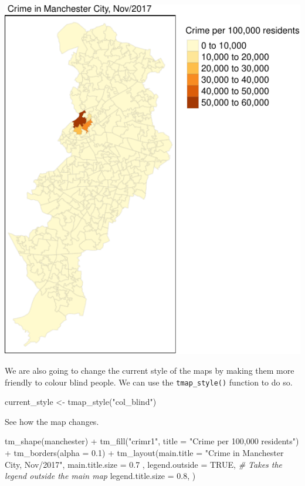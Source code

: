 \documentclass[
]{book}
\makeatletter
\newenvironment{Shaded}{\begin{snugshade}}{\end{snugshade}}
\newcommand{\AttributeTok}[1]{\textcolor[rgb]{0.61,0.61,0.61}{#1}}
\newcommand{\CommentTok}[1]{\textcolor[rgb]{0.37,0.37,0.37}{\textit{#1}}}
\newcommand{\ConstantTok}[1]{\textcolor[rgb]{0,0,0}{#1}}
\newcommand{\FloatTok}[1]{\textcolor[rgb]{0.06,0.06,0.06}{#1}}
\newcommand{\FunctionTok}[1]{\textcolor[rgb]{0,0,0}{#1}}
\newcommand{\NormalTok}[1]{#1}
\newcommand{\OtherTok}[1]{\textcolor[rgb]{0.37,0.37,0.37}{#1}}
\newcommand{\SpecialCharTok}[1]{\textcolor[rgb]{0,0,0}{#1}}
\newcommand{\StringTok}[1]{\textcolor[rgb]{0.5,0.5,0.5}{#1}}
\newenvironment{kframe}{%
\medskip{}
\setlength{\fboxsep}{.8em}
 \def\at@end@of@kframe{}%
 \ifinner\ifhmode%
  \def\at@end@of@kframe{\end{minipage}}%
  \begin{minipage}{\columnwidth}%
 \fi\fi%
 \def\FrameCommand##1{\hskip\@totalleftmargin \hskip-\fboxsep
 \colorbox{shadecolor}{##1}\hskip-\fboxsep
     \hskip-\linewidth \hskip-\@totalleftmargin \hskip\columnwidth}%
 \MakeFramed {\advance\hsize-\width
   \@totalleftmargin\z@ \linewidth\hsize
   \@setminipage}}%
 {\par\unskip\endMakeFramed%
 \at@end@of@kframe}
\renewenvironment{Shaded}{\begin{kframe}}{\end{kframe}}
\makeatother
\begin{document}
\includegraphics{crime_mapping_files/figure-latex/unnamed-chunk-87-1.pdf}

We are also going to change the current style of the maps by making them more friendly to colour blind people. We can use the \texttt{tmap\_style()} function to do so.

\begin{Shaded}
\begin{Highlighting}[]
\NormalTok{current\_style }\OtherTok{\textless{}{-}} \FunctionTok{tmap\_style}\NormalTok{(}\StringTok{"col\_blind"}\NormalTok{)}
\end{Highlighting}
\end{Shaded}

See how the map changes.

\begin{Shaded}
\begin{Highlighting}[]
\FunctionTok{tm\_shape}\NormalTok{(manchester) }\SpecialCharTok{+} 
  \FunctionTok{tm\_fill}\NormalTok{(}\StringTok{"crimr1"}\NormalTok{, }\AttributeTok{title =} \StringTok{"Crime per 100,000 residents"}\NormalTok{) }\SpecialCharTok{+}
  \FunctionTok{tm\_borders}\NormalTok{(}\AttributeTok{alpha =} \FloatTok{0.1}\NormalTok{) }\SpecialCharTok{+}
  \FunctionTok{tm\_layout}\NormalTok{(}\AttributeTok{main.title =} \StringTok{"Crime in Manchester City, Nov/2017"}\NormalTok{, }
            \AttributeTok{main.title.size =} \FloatTok{0.7}\NormalTok{ ,}
            \AttributeTok{legend.outside =} \ConstantTok{TRUE}\NormalTok{,  }\CommentTok{\# Takes the legend outside the main map }
            \AttributeTok{legend.title.size =} \FloatTok{0.8}\NormalTok{,}
\NormalTok{            )}
\end{Highlighting}
\end{Shaded}
\end{document}
